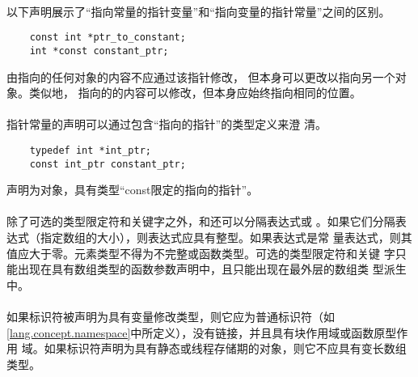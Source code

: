 {\paragraph{}
\ex* 以下声明展示了``指向常量的指针变量''和``指向变量的指针常量''之间的区别。
\begin{lstlisting}
    const int *ptr_to_constant;
    int *const constant_ptr;
\end{lstlisting}
由指向的任何对象的内容不应通过该指针修改，
但本身可以更改以指向另一个对象。类似地，
指向的的内容可以修改，但本身应始终指向相同的位置。

\paragraph{}
指针常量的声明可以通过包含``指向的指针''的类型定义来澄
清。
\begin{lstlisting}
    typedef int *int_ptr;
    const int_ptr constant_ptr;
\end{lstlisting}
声明为对象，具有类型``const限定的指向的指针''。

\constraint
\paragraph{}
除了可选的类型限定符和关键字之外，\tm{[}和\tm{]}还可以分隔表达式或
\tm{*}。如果它们分隔表达式（指定数组的大小），则表达式应具有整型。如果表达式是常
量表达式，则其值应大于零。元素类型不得为不完整或函数类型。可选的类型限定符和关键
字只能出现在具有数组类型的函数参数声明中，且只能出现在最外层的数组类
型派生中。

\paragraph{}
如果标识符被声明为具有变量修改类型，则它应为普通标识符（如
\ref{lang.concept.namespace}中所定义），没有链接，并且具有块作用域或函数原型作用
域。如果标识符声明为具有静态或线程存储期的对象，则它不应具有变长数组类型。

\semantic
}
